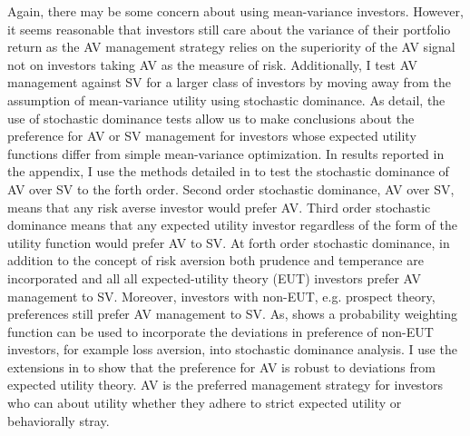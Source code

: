 Again, there may be some concern about using mean-variance investors. However, it seems reasonable that investors still care about the variance of their portfolio return as the AV management strategy relies on the superiority of the AV signal not on investors taking AV as the measure of risk. Additionally, I test AV management against SV for a larger class of investors by moving away from the assumption of mean-variance utility using stochastic dominance. As \citet{hadar_rules_1969,hanoch_efficiency_1969,rothschild_increasing_1970,levy_experimental_2002} detail, the use of stochastic dominance tests allow us to make conclusions about the preference for AV or SV management for investors whose expected utility functions differ from simple mean-variance optimization. In results reported in the appendix, I use the methods detailed in \citet{vinod_h.d._ranking_2004,vinod_hands-intermediate_2008} to test the stochastic dominance of AV over SV to the forth order. Second order stochastic dominance, AV over SV, means that any risk averse investor would prefer AV. \citep{mcfadden_testing_1989,valle_novel_2017} Third order stochastic dominance means that any expected utility investor regardless of the form of the utility function would prefer AV to SV. \citep{whitmore_third-degree_1970,chan_third_2016} At forth order stochastic dominance, in addition to the concept of risk aversion both prudence and temperance are incorporated and all all expected-utility theory (EUT) investors prefer AV management to SV. \citep{kimball_standard_1993,noauthor_risk-aversion_nodate} Moreover, investors with non-EUT, e.g. prospect theory, preferences still prefer AV management to SV. \citep{kahneman_prospect_1979} As, \citet{prelec_probability_1998} shows a probability weighting function can be used to incorporate the deviations in preference of non-EUT investors, for example loss aversion, into stochastic dominance analysis.  I use the extensions in \citet{vinod_generalized_2016} to show that the preference for AV is robust to deviations from expected utility theory. AV is the preferred management strategy for investors who can about utility whether they adhere to strict expected utility or behaviorally stray.

